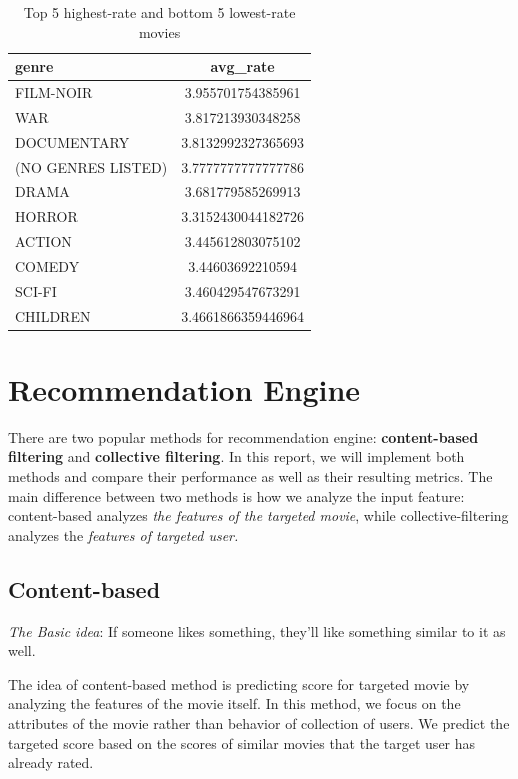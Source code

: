 \documentclass{article}
\begin{document}
\begin{itemize}
    \begin{table}[!ht]
    \centering
    \caption{Top 5 highest-rate and bottom 5 lowest-rate movies}
    \begin{tabular}{lS[table-auto-round]}
    \hline
        {genre} & {avg\_rate} \\ \hline
        FILM-NOIR & 3.955701754385961 \\ 
        WAR & 3.817213930348258 \\ 
        DOCUMENTARY & 3.8132992327365693 \\ 
        (NO GENRES LISTED) & 3.7777777777777786 \\ 
        DRAMA & 3.681779585269913 \\ \hline
        HORROR & 3.3152430044182726 \\ 
        ACTION & 3.445612803075102 \\ 
        COMEDY & 3.44603692210594 \\ 
        SCI-FI & 3.460429547673291 \\ 
        CHILDREN & 3.4661866359446964 \\ \hline
    \end{tabular}
    \label{tab:top5bot5rategenres}
    \end{table}
    
\end{itemize}

\section{Recommendation Engine}

There are two popular methods for recommendation engine: \textbf{content-based filtering }and\textbf{ collective filtering}. In this report, we will implement both methods and compare their performance as well as their resulting metrics. The main difference between two methods is how we analyze the input feature: content-based analyzes \textit{the features of the targeted movie}, while collective-filtering analyzes the \textit{features of targeted user. }

\subsection{Content-based} \label{sec:content-base}

\textit{The Basic idea}: If someone likes something, they’ll like something similar to it as well.

The idea of content-based method is predicting score for targeted movie by analyzing the features of the movie itself. In this method, we focus on the attributes of the movie rather than behavior of collection of users.  We predict the targeted score based on the scores of similar movies that the target user has already rated. 
\end{document}
